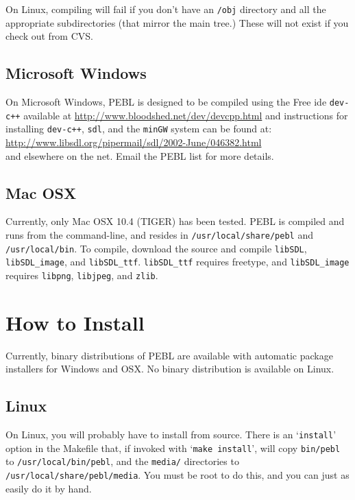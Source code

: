 On Linux, compiling will fail if you don't have an \texttt{/obj}
directory and all the appropriate subdirectories (that mirror the main
tree.)  These will not exist if you check out from CVS.

\subsection{Microsoft Windows}

On Microsoft Windows, PEBL is designed to be compiled using the Free
ide \texttt{dev-c++} available at
\href{http://www.bloodshed.net/dev/devcpp.html}{http://www.bloodshed.net/dev/devcpp.html}
and instructions for installing \texttt{dev-c++}, \texttt{sdl}, and
the \texttt{minGW} system can be found at:\\

\href{http://www.libsdl.org/pipermail/sdl/2002-June/046382.html}{http://www.libsdl.org/pipermail/sdl/2002-June/046382.html}\\

and elsewhere on the net.  Email the PEBL list for more details.

\subsection{Mac OSX}

Currently, only Mac OSX 10.4 (TIGER) has been tested. PEBL is compiled
and runs from the command-line, and resides in
\texttt{/usr/local/share/pebl} and \texttt{/usr/local/bin}.  To
compile, download the source and compile \texttt{libSDL},
\texttt{libSDL\_image}, and \texttt{libSDL\_ttf}.
\texttt{libSDL\_ttf} requires freetype, and \texttt{libSDL\_image}
requires \texttt{libpng}, \texttt{libjpeg}, and \texttt{zlib}.

\section{How to Install}

Currently, binary distributions of PEBL are available with automatic
package installers for Windows and OSX.  No binary distribution is
available on Linux.

\subsection{Linux}

On Linux, you will probably have to install from source.
There is an `\texttt{install}' option in the Makefile that, if invoked with
`\texttt{make install}', will copy \texttt{bin/pebl} to \texttt{/usr/local/bin/pebl}, and the
\texttt{media/} directories to \texttt{/usr/local/share/pebl/media}.  You must be root
to do this, and you can just as easily do it by hand.

